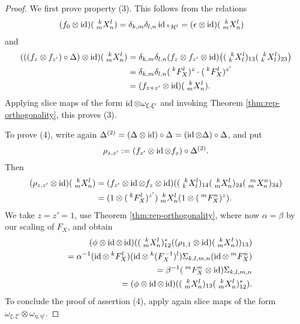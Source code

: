 \begin{proof}
    We first prove property (3). This follows from the relations
    \begin{align*}
      (f_{0}  \otimes \id)(\Gr{X}{k}{l}{m}{n}) &=
      \delta_{k,m}\delta_{l,n} \id_{\Gru{\mathcal{H}}{k}{l}} =
      (\epsilon \otimes \id)(\Gr{X}{k}{l}{m}{n})
    \end{align*}
    and
    \begin{align*}
      (((f_{z}\otimes f_{z'})\circ \Delta) \otimes
      \id)(\Gr{X}{k}{l}{m}{n}) &=  \delta_{k,m}\delta_{l,n}(f_{z} \otimes f_{z'} \otimes
      \id)\big((\Gr{X}{k}{l}{k}{l})_{13}
      (\Gr{X}{k}{l}{k}{l})_{23}\big) \\
      &=  \delta_{k,m}\delta_{l,n}(\Gru{F_{X}}{k}{l})^{z}  \cdot (\Gru{F_{X}}{k}{l})^{z'} \\
      &= (f_{z+z'} \otimes \id)(\Gr{X}{k}{l}{m}{n}).
    \end{align*}
    Applying slice maps of the form $\id
    \otimes \omega_{\xi,\xi'}$ and invoking Theorem \ref{thm:rep-orthogonality}, this proves (3).

    To prove (4), write again $ \Delta^{(2)} = (
    \Delta \otimes \id)\circ  \Delta = (\id \otimes 
    \Delta) \circ \Delta$, and put \[\rho_{z,z'}:=(f_{z'} \otimes \id
    \otimes f_{z})\circ  \Delta^{(2)}.\] Then
    \begin{align*}
      (\rho_{z,z'} \otimes \id)(\Gr{X}{k}{l}{m}{n}) &= (f_{z'} \otimes
      \id \otimes f_{z} \otimes
      \id)((\Gr{X}{k}{l}{k}{l})_{14}(\Gr{X}{k}{l}{m}{n})_{24}(\Gr{X}{m}{n}{m}{n})_{34})
      \\
      &= (1 \otimes (\Gru{F_{X}}{k}{l})^{z'}) \Gr{X}{k}{l}{m}{n} (1
      \otimes (\Gru{F_{X}}{m}{n})^{z}).
    \end{align*}
    We take $z=z'=1$, use Theorem \ref{thm:rep-orthogonality}, where
    now $\alpha= \beta$ by our scaling of $F_{X}$, and obtain
    \begin{eqnarray*}
     && \hspace{-2cm} (\phi \otimes \id \otimes
      \id)((\Gr{X}{k}{l}{m}{n})_{12}^{*}((\rho_{1,1} \otimes
      \id)(\Gr{X}{k}{l}{m}{n}))_{13})\\ && =\alpha^{-1}(\id \otimes
      \Gru{F_{X}}{k}{l}) (\id \otimes \Gru{(F_{X}^{-1})}{k}{l})
      \Sigma_{k,l,m,n} (\id \otimes
      \Gru{F_{X}}{m}{n}) \\
      &&=\beta^{-1}(\Gru{F_{X}}{m}{n} \otimes \id) \Sigma_{k,l,m,n} \\
      &&= (\phi \otimes \id \otimes
      \id)((\Gr{X}{k}{l}{m}{n})_{13}(\Gr{X}{k}{l}{m}{n})_{12}^{*}).
    \end{eqnarray*}
    To conclude the proof of assertion (4), apply again slice maps of the form
    $\omega_{\xi,\xi'} \otimes \omega_{\eta,\eta'}$.


\end{proof}
